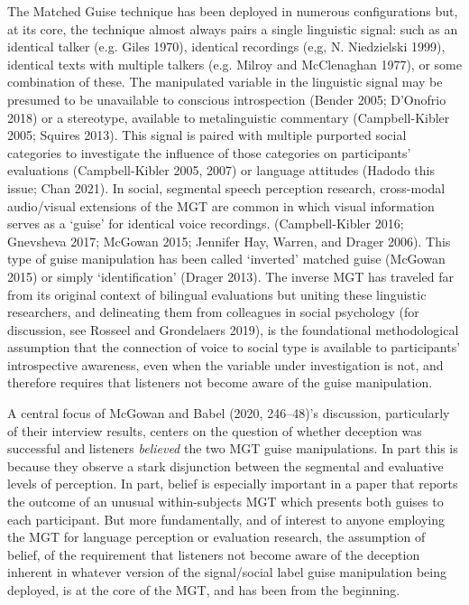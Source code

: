 \documentclass[
  letterpaper,
  DIV=11,
  numbers=noendperiod]{scrartcl}
\begin{document}
The Matched Guise technique has been deployed in numerous configurations
but, at its core, the technique almost always pairs a single linguistic
signal: such as an identical talker (e.g. Giles 1970), identical
recordings (e,g, N. Niedzielski 1999), identical texts with multiple
talkers (e.g. Milroy and McClenaghan 1977), or some combination of
these. The manipulated variable in the linguistic signal may be presumed
to be unavailable to conscious introspection (Bender 2005; D'Onofrio
2018) or a stereotype, available to metalinguistic commentary
(Campbell-Kibler 2005; Squires 2013). This signal is paired with
multiple purported social categories to investigate the influence of
those categories on participants' evaluations (Campbell-Kibler 2005,
2007) or language attitudes (Hadodo this issue; Chan 2021). In social,
segmental speech perception research, cross-modal audio/visual
extensions of the MGT are common in which visual information serves as a
`guise' for identical voice recordings. (Campbell-Kibler 2016; Gnevsheva
2017; McGowan 2015; Jennifer Hay, Warren, and Drager 2006). This type of
guise manipulation has been called `inverted' matched guise (McGowan
2015) or simply `identification' (Drager 2013). The inverse MGT has
traveled far from its original context of bilingual evaluations but
uniting these linguistic researchers, and delineating them from
colleagues in social psychology (for discussion, see Rosseel and
Grondelaers 2019), is the foundational methodological assumption that
the connection of voice to social type is available to participants'
introspective awareness, even when the variable under investigation is
not, and therefore requires that listeners not become aware of the guise
manipulation.

A central focus of McGowan and Babel (2020, 246--48)'s discussion,
particularly of their interview results, centers on the question of
whether deception was successful and listeners \emph{believed} the two
MGT guise manipulations. In part this is because they observe a stark
disjunction between the segmental and evaluative levels of perception.
In part, belief is especially important in a paper that reports the
outcome of an unusual within-subjects MGT which presents both guises to
each participant. But more fundamentally, and of interest to anyone
employing the MGT for language perception or evaluation research, the
assumption of belief, of the requirement that listeners not become aware
of the deception inherent in whatever version of the signal/social label
guise manipulation being deployed, is at the core of the MGT, and has
been from the beginning.
\end{document}
